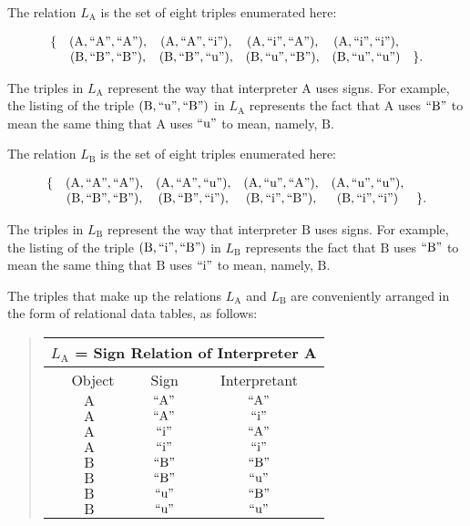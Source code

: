 \documentclass[12pt]{article}
\begin{document}
The relation $L_{\mathrm{A}}$ is the set of eight triples enumerated here:

\[ \begin{array}{lccccr}
\{ & \mathrm{(A,``A",``A")}, & \mathrm{(A,``A",``i")}, & \mathrm{(A,``i",``A")}, & \mathrm{(A,``i",``i")}, & \\
   & \mathrm{(B,``B",``B")}, & \mathrm{(B,``B",``u")}, & \mathrm{(B,``u",``B")}, & \mathrm{(B,``u",``u")}  & \}.
\end{array} \]

The triples in $L_{\mathrm{A}}$ represent the way that interpreter $\mathrm{A}$ uses signs.  For example, the listing of the triple $\mathrm{(B,``u",``B")}$ in $L_{\mathrm{A}}$ represents the fact that $\mathrm{A}$ uses $\mathrm{``B"}$ to mean the same thing that $\mathrm{A}$ uses $\mathrm{``u"}$ to mean, namely, $\mathrm{B}$.

The relation $L_{\mathrm{B}}$ is the set of eight triples enumerated here:

\[ \begin{array}{lccccr}
\{ & \mathrm{(A,``A",``A")}, & \mathrm{(A,``A",``u")}, & \mathrm{(A,``u",``A")}, & \mathrm{(A,``u",``u")}, & \\
   & \mathrm{(B,``B",``B")}, & \mathrm{(B,``B",``i")}, & \mathrm{(B,``i",``B")}, & \mathrm{(B,``i",``i")}  & \}.
\end{array} \]

The triples in $L_{\mathrm{B}}$ represent the way that interpreter $\mathrm{B}$ uses signs. For example, the listing of the triple $\mathrm{(B,``i",``B")}$ in $L_{\mathrm{B}}$ represents the fact that $\mathrm{B}$ uses $\mathrm{``B"}$ to mean the same thing that $\mathrm{B}$ uses $\mathrm{``i"}$ to mean, namely, $\mathrm{B}$.

The triples that make up the relations $L_{\mathrm{A}}$ and $L_{\mathrm{B}}$ are conveniently arranged in the form of relational data tables, as follows:

\begin{quote}
\begin{tabular}{|c|c|c|}
\multicolumn{3}{c}{$L_{\mathrm{A}}$ = Sign Relation of Interpreter A} \\
\hline\
Object       & Sign            & Interpretant     \\
\hline\hline
$\mathrm{A}$ & $\mathrm{``A"}$ & $\mathrm{``A"}$  \\
\hline
$\mathrm{A}$ & $\mathrm{``A"}$ & $\mathrm{``i"}$  \\
\hline
$\mathrm{A}$ & $\mathrm{``i"}$ & $\mathrm{``A"}$  \\
\hline
$\mathrm{A}$ & $\mathrm{``i"}$ & $\mathrm{``i"}$  \\
\hline
$\mathrm{B}$ & $\mathrm{``B"}$ & $\mathrm{``B"}$  \\
\hline
$\mathrm{B}$ & $\mathrm{``B"}$ & $\mathrm{``u"}$  \\
\hline
$\mathrm{B}$ & $\mathrm{``u"}$ & $\mathrm{``B"}$  \\
\hline
$\mathrm{B}$ & $\mathrm{``u"}$ & $\mathrm{``u"}$  \\
\hline
\end{tabular}
\end{quote}
\end{document}
